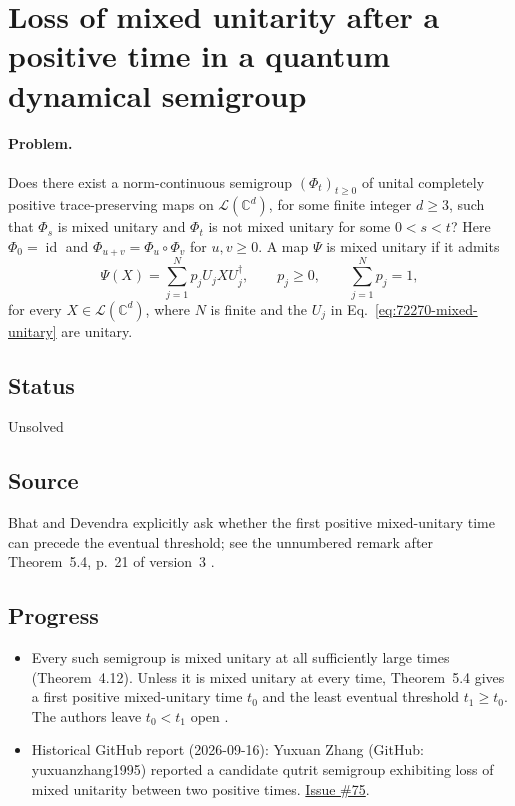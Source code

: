 \section{Loss of mixed unitarity after a positive time in a quantum dynamical semigroup}
\label{sec:op_722706a9205dcff2}

\paragraph{Problem.}
Does there exist a norm-continuous semigroup $(\Phi_t)_{t\geq0}$ of
unital completely positive trace-preserving maps on $\mathcal L(\mathbb C^d)$,
for some finite integer $d\geq3$, such that $\Phi_s$ is mixed unitary and
$\Phi_t$ is not mixed unitary for some $0<s<t$?
Here $\Phi_0=\operatorname{id}$ and $\Phi_{u+v}=\Phi_u\circ\Phi_v$ for
$u,v\geq0$. A map $\Psi$ is mixed unitary if it admits
\begin{equation}
  \Psi(X)=\sum_{j=1}^{N}p_j U_j XU_j^\dagger,
  \qquad p_j\geq0,\qquad\sum_{j=1}^{N}p_j=1,
  \label{eq:72270-mixed-unitary}
\end{equation}
for every $X\in\mathcal L(\mathbb C^d)$, where $N$ is finite and the
$U_j$ in Eq.~\eqref{eq:72270-mixed-unitary} are unitary.

\subsection*{Status}

Unsolved

\subsection*{Source}

Bhat and Devendra explicitly ask whether the first positive mixed-unitary
time can precede the eventual threshold; see the unnumbered remark after
Theorem~5.4, p.~21 of version~3 .

\subsection*{Progress}

\begin{itemize}
  \item Every such semigroup is mixed unitary at all sufficiently large times
(Theorem~4.12). Unless it is mixed unitary at every time, Theorem~5.4 gives
a first positive mixed-unitary time $t_0$ and the least eventual threshold
$t_1\geq t_0$. The authors leave $t_0<t_1$ open
.

  \item Historical GitHub report (2026-09-16): Yuxuan Zhang (GitHub: yuxuanzhang1995) reported a candidate qutrit semigroup exhibiting loss of mixed unitarity between two positive times. \href{https://github.com/Naixu-Guo/quantum-open-problems/issues/75}{Issue \#75}.
\end{itemize}

